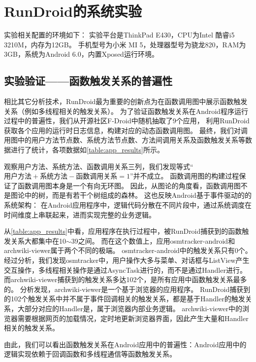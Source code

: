
\chapter{RunDroid的系统实验}  
\label{chp:testing}


实验相关配置的环境如下：
实验平台是ThinkPad E430，CPU为Intel 酷睿i5 3210M，内存为12GB。
手机型号为小米 MI 5，处理器型号为骁龙820，RAM为3GB，系统为Android 6.0，内置Xposed运行环境。




\section{实验验证——函数触发关系的普遍性}

相比其它分析技术，RunDroid最为重要的创新点为在函数调用图中展示函数触发关系（例如多线程相关的触发关系）。
为了验证函数触发关系在Android程序运行过程中的普遍性，我们从开源社区F-Droid\cite{FDroidFr21:online}中随机抽取了9个应用，
利用RunDroid获取各个应用的运行时日志信息，构建对应的动态函数调用图。
最终，我们对调用图中的用户方法节点数、系统方法节点数、方法间调用关系及函数触发关系等数据进行了统计，各项数据如\autoref{table:app_results}所示。

观察用户方法、系统方法、函数调用关系三列，我们发现等式“$\text{用户方法}+\text{系统方法}-\text{函数调用关系}=1$”并不成立。
函数调用图的构建过程保证了函数调用图本身是一个有向无环图。
因此，从图论的角度看，函数调用图不是图论中的树，而是有若干个树组成的森林。
这也反映Android基于事件驱动的的系统架构：
在Android应用程序中，逻辑代码分散在不同片段中，通过系统调度在时间维度上串联起来，进而实现完整的业务逻辑。


从\autoref{table:app_results}中看，应用程序在执行过程中，被RunDroid捕获到的函数触发关系大都集中在10$\sim$39之间。
而在这个数值上，应用osmtracker-android和	archwiki-viewer属于两个不同的极端。
osmtracker-android中的触发关系只有0个。
经过分析，我们发现osmtracker中，用户操作大多与菜单、对话框与ListView产生交互操作，多线程相关操作是通过AsyncTask进行的，而不是通过Handler进行。
而archwiki-viewer捕获到的触发关系多达102个，是所有应用中函数触发关系最多的。
分析发现，archwiki-viewer是一个基于浏览器的应用程序。
RunDroid捕获到的102个触发关系中并不属于事件回调相关的触发关系，都是基于Handler的触发关系，大部分对应的Handler是，属于浏览器内部业务逻辑。
archwiki-viewer中的浏览器需要根据网页的加载情况，定时地更新浏览器界面，因此产生大量和Handler相关的触发关系。

由此，我们可以看出函数触发关系在Android应用中的普遍性：Android应用中的逻辑实现依赖于回调函数和多线程通信等函数触发关系。

